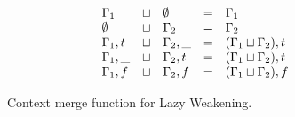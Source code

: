 \documentclass[conference]{IEEEtran}
\begin{document}
\begin{figure}
    \begin{equation*}
        \begin{array}{l l l l l}
            \Gamma_1    & \sqcup & \emptyset   & = & \Gamma_1                     \\
            \emptyset   & \sqcup & \Gamma_2    & = & \Gamma_2                     \\
            \Gamma_1,t  & \sqcup & \Gamma_2,\_ & = & (\Gamma_1 \sqcup \Gamma_2),t \\
            \Gamma_1,\_ & \sqcup & \Gamma_2,t  & = & (\Gamma_1 \sqcup \Gamma_2),t \\
            \Gamma_1,f  & \sqcup & \Gamma_2,f  & = & (\Gamma_1 \sqcup \Gamma_2),f \\
        \end{array}
    \end{equation*}
    \centering
    \caption{Context merge function for Lazy Weakening.}
    \label{fig:lazy-ctx}
\end{figure}
\end{document}
